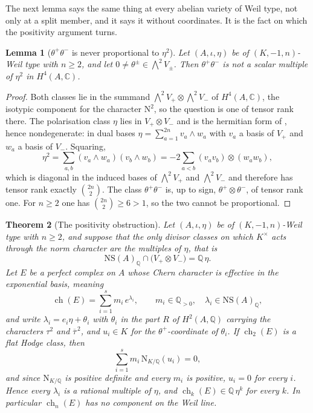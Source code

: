 \documentclass[11pt,reqno]{amsart}
\theoremstyle{plain}
\newtheorem{theorem}{Theorem}[section]
\newtheorem{lemma}[theorem]{Lemma}
\theoremstyle{definition}
\theoremstyle{remark}
\newcommand{\QQ}{\mathbb{Q}}
\newcommand{\CC}{\mathbb{C}}
\newcommand{\NS}{\mathrm{NS}}
\newcommand{\Nm}{\mathrm{N}}             %
\DeclareMathOperator{\ch}{ch}
\newcommand{\Kx}{K^{\times}}
\newcommand{\bbar}[1]{\overline{#1}}
\begin{document}
The next lemma says the same thing at every abelian variety of Weil type, not
only at a split member, and it says it without coordinates. It is the fact on
which the positivity argument turns.

\begin{lemma}[$\theta^{+}\theta^{-}$ is never proportional to $\eta^{2}$]
\label{lem:tensorrank}
Let $(A,\iota,\eta)$ be of $(K,-1,n)$-Weil type with $n\ge2$, and let
$0\ne\theta^{\pm}\in\bigwedge^{2}V_{\pm}$. Then $\theta^{+}\theta^{-}$ is not a
scalar multiple of $\eta^{2}$ in $H^{4}(A,\CC)$.
\end{lemma}

\begin{proof}
Both classes lie in the summand
$\bigwedge^{2}V_{+}\otimes\bigwedge^{2}V_{-}$ of $H^{4}(A,\CC)$, the isotypic
component for the character $\Nm^{2}$, so the question is one of tensor rank
there. The polarisation class $\eta$ lies in $V_{+}\otimes V_{-}$ and is the
hermitian form of \cite[Proposition~3.7]{paperI}, hence nondegenerate: in dual bases
$\eta=\sum_{a=1}^{2n}v_{a}\wedge w_{a}$ with $v_{a}$ a basis of $V_{+}$ and
$w_{a}$ a basis of $V_{-}$. Squaring,
\[
  \eta^{2}
  =\sum_{a,b}(v_{a}\wedge w_{a})(v_{b}\wedge w_{b})
  =-2\sum_{a<b}(v_{a}v_{b})\otimes(w_{a}w_{b}),
\]
which is diagonal in the induced bases of $\bigwedge^{2}V_{+}$ and
$\bigwedge^{2}V_{-}$ and therefore has tensor rank exactly $\binom{2n}{2}$.
The class $\theta^{+}\theta^{-}$ is, up to sign,
$\theta^{+}\otimes\theta^{-}$, of tensor rank one. For $n\ge2$ one has
$\binom{2n}{2}\ge6>1$, so the two cannot be proportional.
\end{proof}

\begin{theorem}[The positivity obstruction]\label{thm:positivity}
Let $(A,\iota,\eta)$ be of $(K,-1,n)$-Weil type with $n\ge2$, and suppose that
the only divisor classes on which $\Kx$ acts through the norm character are
the multiples of $\eta$, that is
\begin{equation}\label{eq:noextranorm}
  \NS(A)_{\QQ}\cap\bigl(V_{+}\otimes V_{-}\bigr)=\QQ\,\eta .
\end{equation}
Let $E$ be a perfect complex on $A$ whose Chern character is effective in the
exponential basis, meaning
\begin{equation}\label{eq:effectivech}
  \ch(E)=\sum_{i=1}^{s}m_{i}\,e^{\lambda_{i}},
  \qquad m_{i}\in\QQ_{>0},\quad\lambda_{i}\in\NS(A)_{\QQ},
\end{equation}
and write $\lambda_{i}=e_{i}\eta+\theta_{i}$ with $\theta_{i}$ in the part $R$
of $H^{2}(A,\QQ)$ carrying the characters $\tau^{2}$ and $\bbar\tau^{\,2}$, and
$u_{i}\in K$ for the $\theta^{+}$-coordinate of $\theta_{i}$. If $\ch_{2}(E)$
is a flat Hodge class, then
\begin{equation}\label{eq:normsum}
  \sum_{i=1}^{s}m_{i}\,\Nm_{K/\QQ}(u_{i})=0 ,
\end{equation}
and since $\Nm_{K/\QQ}$ is positive definite and every $m_{i}$ is positive,
$u_{i}=0$ for every $i$. Hence every $\lambda_{i}$ is a rational multiple of
$\eta$, and $\ch_{k}(E)\in\QQ\,\eta^{k}$ for every $k$. In particular
$\ch_{n}(E)$ has no component on the Weil line.
\end{theorem}
\end{document}

